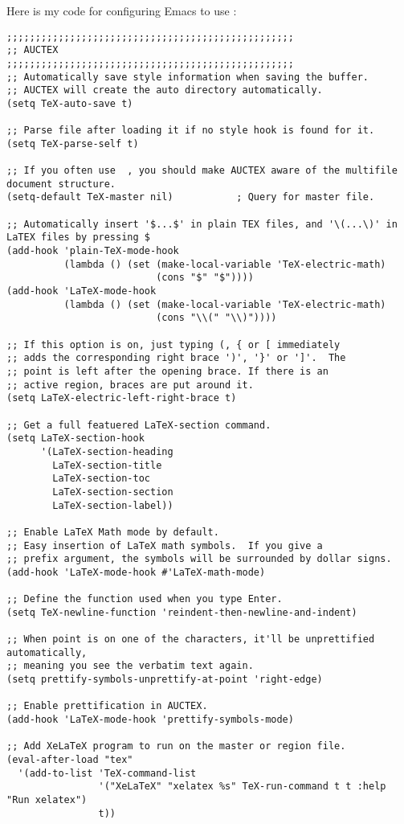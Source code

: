 Here is my code for configuring Emacs to use \auctex{}:
\begin{lstlisting}
;;;;;;;;;;;;;;;;;;;;;;;;;;;;;;;;;;;;;;;;;;;;;;;;;;
;; AUCTEX
;;;;;;;;;;;;;;;;;;;;;;;;;;;;;;;;;;;;;;;;;;;;;;;;;;
;; Automatically save style information when saving the buffer.
;; AUCTEX will create the auto directory automatically.
(setq TeX-auto-save t)

;; Parse file after loading it if no style hook is found for it.
(setq TeX-parse-self t)

;; If you often use  , you should make AUCTEX aware of the multifile document structure.
(setq-default TeX-master nil)           ; Query for master file.

;; Automatically insert '$...$' in plain TEX files, and '\(...\)' in LaTEX files by pressing $
(add-hook 'plain-TeX-mode-hook
          (lambda () (set (make-local-variable 'TeX-electric-math)
                          (cons "$" "$"))))
(add-hook 'LaTeX-mode-hook
          (lambda () (set (make-local-variable 'TeX-electric-math)
                          (cons "\\(" "\\)"))))

;; If this option is on, just typing (, { or [ immediately
;; adds the corresponding right brace ')', '}' or ']'.  The
;; point is left after the opening brace. If there is an
;; active region, braces are put around it.
(setq LaTeX-electric-left-right-brace t)

;; Get a full featuered LaTeX-section command.
(setq LaTeX-section-hook
      '(LaTeX-section-heading
        LaTeX-section-title
        LaTeX-section-toc
        LaTeX-section-section
        LaTeX-section-label))

;; Enable LaTeX Math mode by default.
;; Easy insertion of LaTeX math symbols.  If you give a
;; prefix argument, the symbols will be surrounded by dollar signs.
(add-hook 'LaTeX-mode-hook #'LaTeX-math-mode)

;; Define the function used when you type Enter.
(setq TeX-newline-function 'reindent-then-newline-and-indent)

;; When point is on one of the characters, it'll be unprettified automatically,
;; meaning you see the verbatim text again.
(setq prettify-symbols-unprettify-at-point 'right-edge)

;; Enable prettification in AUCTEX.
(add-hook 'LaTeX-mode-hook 'prettify-symbols-mode)

;; Add XeLaTeX program to run on the master or region file.
(eval-after-load "tex"
  '(add-to-list 'TeX-command-list
                '("XeLaTeX" "xelatex %s" TeX-run-command t t :help "Run xelatex")
                t))


\end{lstlisting}
